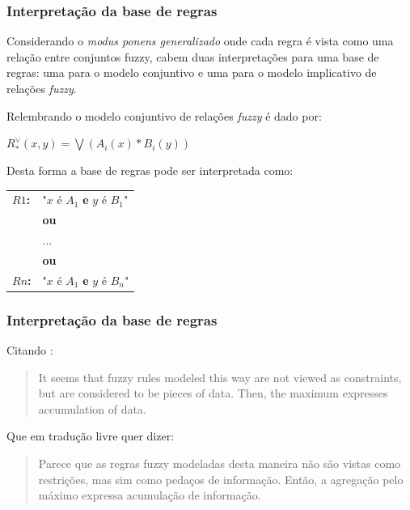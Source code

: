 \documentclass{beamer}
\theoremstyle{definition}
\begin{document}
\begin{frame}
\frametitle{Interpretação da base de regras}
Considerando o \textit{modus ponens generalizado} onde cada regra é vista como uma relação entre conjuntos fuzzy, cabem duas interpretações para uma base de regras: uma para o modelo conjuntivo e uma para o modelo implicativo de relações \textit{fuzzy}.\par
Relembrando o modelo conjuntivo de relações \textit{fuzzy} é dado por:
\begin{center}
$R^{\vee}_{\ast}(x,y) = \bigvee (A_{i}(x) \ast B_{i}(y))$
\end{center}
Desta forma a base de regras pode ser interpretada como:
\begin{table}[H]
\centering
\label{base-de-regras-conjuntivo}
\begin{tabular}{ll}
\textbf{$R1$:}      & "$x$ é $A_{1}$ \textbf{e} $y$ é $B_{1}$" \\
      & \textbf{ou}                 \\
      & ...                 \\
      & \textbf{ou}                 \\     
\textbf{$Rn$:} & "$x$ é $A_{1}$ \textbf{e} $y$ é $B_{n}$"                
\end{tabular}
\end{table}
\end{frame}

\begin{frame}
\frametitle{Interpretação da base de regras}
Citando \cite{p4}:
\begin{quote}
It seems that fuzzy rules modeled this way are not viewed as constraints, but are considered to be pieces of data. Then, the maximum expresses accumulation of data.
\end{quote}
Que em tradução livre quer dizer:
\begin{quote}
Parece que as regras fuzzy modeladas desta maneira não são vistas como restrições, mas sim como pedaços de informação. Então, a agregação pelo máximo expressa acumulação de informação.
\end{quote}
\end{frame}
\end{document}
